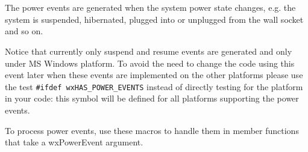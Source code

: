 
\section{}\label{wxpowerevent}

The power events are generated when the system power state changes, e.g. the
system is suspended, hibernated, plugged into or unplugged from the wall socket
and so on.

Notice that currently only suspend and resume events are generated and only
under MS Windows platform. To avoid the need to change the code using this
event later when these events are implemented on the other platforms please use
the test \texttt{#ifdef wxHAS\_POWER\_EVENTS} instead of directly testing for
the platform in your code: this symbol will be defined for all platforms
supporting the power events.


To process power events, use these macros to handle them in
member functions that take a wxPowerEvent argument.

\twocolwidtha{9cm}
\begin{twocollist}\itemsep=0pt
\end{twocollist}%


\\

